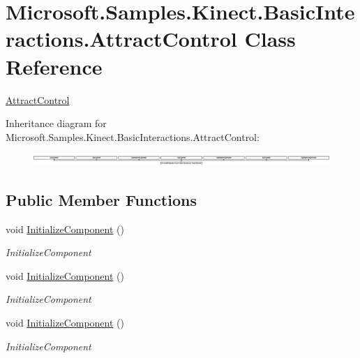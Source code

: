 \hypertarget{class_microsoft_1_1_samples_1_1_kinect_1_1_basic_interactions_1_1_attract_control}{\section{Microsoft.\-Samples.\-Kinect.\-Basic\-Interactions.\-Attract\-Control Class Reference}
\label{class_microsoft_1_1_samples_1_1_kinect_1_1_basic_interactions_1_1_attract_control}
}


\hyperlink{class_microsoft_1_1_samples_1_1_kinect_1_1_basic_interactions_1_1_attract_control}{Attract\-Control}  


Inheritance diagram for Microsoft.\-Samples.\-Kinect.\-Basic\-Interactions.\-Attract\-Control\-:\begin{figure}[H]
\begin{center}
\leavevmode
\includegraphics[height=0.463768cm]{class_microsoft_1_1_samples_1_1_kinect_1_1_basic_interactions_1_1_attract_control}
\end{center}
\end{figure}
\subsection*{Public Member Functions}
\begin{DoxyCompactItemize}
\item 
void \hyperlink{class_microsoft_1_1_samples_1_1_kinect_1_1_basic_interactions_1_1_attract_control_a9c33dba17c7284f6a647930ea2b70655}{Initialize\-Component} ()
\begin{DoxyCompactList}\small\item\em Initialize\-Component \end{DoxyCompactList}\item 
void \hyperlink{class_microsoft_1_1_samples_1_1_kinect_1_1_basic_interactions_1_1_attract_control_a9c33dba17c7284f6a647930ea2b70655}{Initialize\-Component} ()
\begin{DoxyCompactList}\small\item\em Initialize\-Component \end{DoxyCompactList}\item 
void \hyperlink{class_microsoft_1_1_samples_1_1_kinect_1_1_basic_interactions_1_1_attract_control_a9c33dba17c7284f6a647930ea2b70655}{Initialize\-Component} ()
\begin{DoxyCompactList}\small\item\em Initialize\-Component \end{DoxyCompactList}\end{DoxyCompactItemize}
